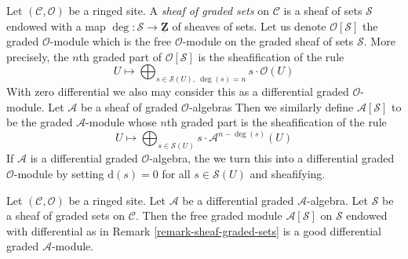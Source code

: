 \begin{remark}
\label{remark-sheaf-graded-sets}
Let $(\mathcal{C}, \mathcal{O})$ be a ringed site. A
{\it sheaf of graded sets} on $\mathcal{C}$ is a sheaf
of sets $\mathcal{S}$ endowed with a map
$\deg : \mathcal{S} \to \underline{\mathbf{Z}}$
of sheaves of sets. Let us denote $\mathcal{O}[\mathcal{S}]$
the graded $\mathcal{O}$-module which is the
free $\mathcal{O}$-module on the graded sheaf of sets $\mathcal{S}$.
More precisely, the $n$th graded part of
$\mathcal{O}[\mathcal{S}]$ is the sheafification of the rule
$$
U \longmapsto
\bigoplus\nolimits_{s \in \mathcal{S}(U),\ \deg(s) = n} s \cdot \mathcal{O}(U)
$$
With zero differential we also may consider this as a
differential graded $\mathcal{O}$-module.
Let $\mathcal{A}$ be a sheaf of graded $\mathcal{O}$-algebras
Then we similarly define $\mathcal{A}[\mathcal{S}]$ to be the
graded $\mathcal{A}$-module whose $n$th graded part is the
sheafification of the rule
$$
U \longmapsto
\bigoplus\nolimits_{s \in \mathcal{S}(U)} s \cdot \mathcal{A}^{n - \deg(s)}(U)
$$
If $\mathcal{A}$ is a differential graded $\mathcal{O}$-algebra, the
we turn this into a differential graded $\mathcal{O}$-module
by setting $\text{d}(s) = 0$ for all $s \in \mathcal{S}(U)$
and sheafifying.
\end{remark}

\begin{lemma}
\label{lemma-free-graded-module-good}
Let $(\mathcal{C}, \mathcal{O})$ be a ringed site.
Let $\mathcal{A}$ be a differential graded $\mathcal{A}$-algebra.
Let $\mathcal{S}$ be a sheaf of graded sets on $\mathcal{C}$.
Then the free graded module $\mathcal{A}[\mathcal{S}]$
on $\mathcal{S}$ endowed with differential as in
Remark \ref{remark-sheaf-graded-sets}
is a good differential graded $\mathcal{A}$-module.
\end{lemma}

